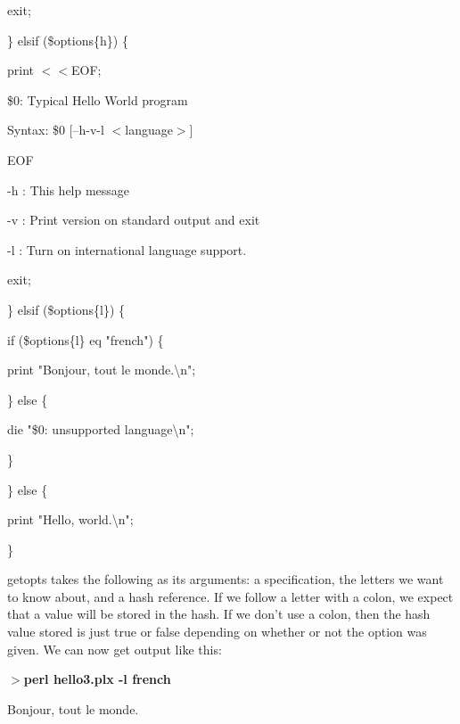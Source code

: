 \documentclass[a4paper,11pt]{book}
\begin{document}
\noindent exit;

\noindent \} elsif (\$options\{h\}) \{

\noindent print $<$$<$EOF;

\noindent 

\noindent \$0: Typical Hello World program

\noindent 

\noindent Syntax: \$0 [--h\textbar -v\textbar -l $<$language$>$]

\noindent 

\noindent 

\noindent 

\noindent 

\noindent EOF

\noindent 

\noindent -h : This help message

\noindent -v : Print version on standard output and exit

\noindent -l : Turn on international language support.

\noindent 

\noindent exit;

\noindent \} elsif (\$options\{l\}) \{

\noindent if (\$options\{l\} eq "french") \{

\noindent print "Bonjour, tout le monde.\textbackslash n";

\noindent \} else \{

\noindent die "\$0: unsupported language\textbackslash n";

\noindent \}

\noindent \} else \{

\noindent print "Hello, world.\textbackslash n";

\noindent \}

\noindent 

\noindent getopts takes the following as its arguments: a specification, the letters we want to know about, and a hash reference. If we follow a letter with a colon, we expect that a value will be stored in the hash. If we don't use a colon, then the hash value stored is just true or false depending on whether or not the option was given. We can now get output like this:

\noindent 

\noindent 

\noindent $>$\textbf{perl hello3.plx -l french}

\noindent Bonjour, tout le monde.
\end{document}
